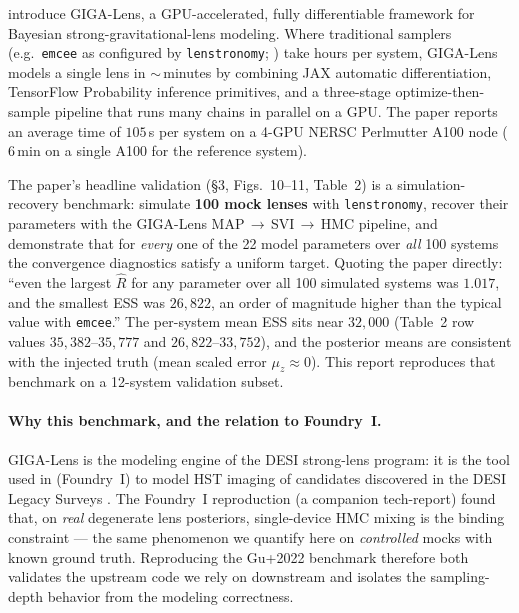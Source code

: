 \documentclass[11pt,letterpaper]{article}
\newcommand{\muz}{\ensuremath{\mu_z}}
\begin{document}
\citet{gu2022gigalens} introduce GIGA-Lens, a GPU-accelerated, fully
differentiable framework for Bayesian strong-gravitational-lens modeling.
Where traditional samplers (e.g.\ \texttt{emcee} as configured by
\texttt{lenstronomy}; \citealt{birrer2021lenstronomy}) take hours per
system, GIGA-Lens models a single lens in $\sim$\,minutes by combining
JAX \citep{jax2018github} automatic differentiation, TensorFlow Probability
\citep{dillon2017tfp} inference primitives, and a three-stage
optimize-then-sample pipeline that runs many chains in parallel on a GPU.
The paper reports an average time of $105$\,s per system on a 4-GPU NERSC
Perlmutter A100 node ($6$\,min on a single A100 for the reference system).

The paper's headline validation (\S3, Figs.~10--11, Table~2) is a
simulation-recovery benchmark: simulate \textbf{100 mock lenses} with
\texttt{lenstronomy}, recover their parameters with the GIGA-Lens
MAP\,$\to$\,SVI\,$\to$\,HMC pipeline, and demonstrate that for \emph{every}
one of the 22 model parameters over \emph{all} 100 systems the convergence
diagnostics satisfy a uniform target. Quoting the paper directly: ``even the
largest $\hat{R}$ for any parameter over all 100 simulated systems was
$1.017$, and the smallest ESS was $26{,}822$, an order of magnitude higher
than the typical value with \texttt{emcee}.'' The per-system mean ESS sits
near $32{,}000$ (Table~2 row values $35{,}382$--$35{,}777$ and
$26{,}822$--$33{,}752$), and the posterior means are consistent with the
injected truth (mean scaled error $\muz\approx0$). This report reproduces
that benchmark on a 12-system validation subset.

\paragraph{Why this benchmark, and the relation to Foundry~I.}
GIGA-Lens is the modeling engine of the DESI strong-lens program: it is the
tool used in \citet{huang2025foundry1} (Foundry~I) to model HST imaging of
candidates discovered in the DESI Legacy Surveys \citep{huang2021decals}.
The Foundry~I reproduction (a companion tech-report) found that, on
\emph{real} degenerate lens posteriors, single-device HMC mixing is the
binding constraint --- the same phenomenon we quantify here on
\emph{controlled} mocks with known ground truth. Reproducing the Gu+2022
benchmark therefore both validates the upstream code we rely on downstream
and isolates the sampling-depth behavior from the modeling correctness.
\end{document}
